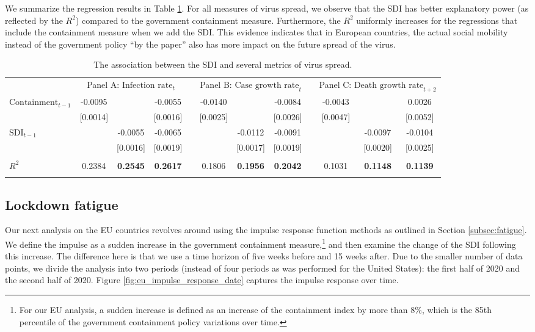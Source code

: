 \documentclass[dvipsnames]{article}
\begin{document}
We summarize the regression results in Table \ref{tab:EU}. For all measures of virus spread, we observe that the SDI has better explanatory power (as reflected by the $R^2$) compared to the government containment measure. Furthermore, the $R^2$ uniformly increases for the regressions that include the containment measure when we add the SDI. This evidence indicates that in European countries, the actual social mobility instead of the government policy ``by the paper'' also has more impact on the future spread of the virus.

\begin{table}[h!]
\centering
\begin{tabular}{lccccccccccc}         							
\hline
\noalign{\smallskip}
\hline
\noalign{\smallskip}                                        
& \multicolumn{3}{c}{Panel A: $\text{Infection \ rate}_t$} &   &	 \multicolumn{3}{c}{Panel B: $\text{Case \ growth \ rate}_t$} & 	& \multicolumn{3}{c}{Panel C: $\text{Death \ growth \ rate}_{t+2}$}	\\	
\cmidrule(lr){2-4}\cmidrule(lr){6-8} \cmidrule(lr){9-12} 
$\text{Containment}_{t-1}$	& 	-0.0095	 & 	 &-0.0055	& &-0.0140	 &	 & -0.0084 & 	& 	-0.0043 &	 & 0.0026 \\
	&	[0.0014]	& 	& [0.0016] & 	&[0.0025]	 &	 & [0.0026]& 	&[0.0047] &	 & [0.0052]	\\
$\text{SDI}_{t-1}$	&	&	-0.0055 		& -0.0065	&&	&-0.0112	 & -0.0091 & 	 & &-0.0097 & -0.0104 \\
	&	&[0.0016]	& [0.0019]&  &	&[0.0017] & [0.0019]& 		 & &[0.0020]	 & [0.0025]	\\
\\
$R^2$ & 0.2384  & \textbf{0.2545} & \textbf{0.2617} &		&0.1806 & \textbf{0.1956} & \textbf{0.2042} & &0.1031  & \textbf{0.1148} &  \textbf{0.1139} \\
\hline\noalign{\smallskip} 
\hline\noalign{\smallskip}                                        			
\end{tabular}
\caption{The association between the SDI and several metrics of virus spread.}
\label{tab:EU}
\end{table}

\subsection{Lockdown fatigue}

Our next analysis on the EU countries revolves around using the impulse response function methods as outlined in Section \ref{subsec:fatigue}. We define the impulse as a sudden increase in the government containment measure,\footnote{For our EU analysis, a sudden increase is defined as an increase of the containment index by more than 8\%, which is the 85th percentile of the government containment policy variations over time.} and then examine the change of the SDI following this increase. The difference here is that we use a time horizon of five weeks before and 15 weeks after. Due to the smaller number of data points, we divide the analysis into two periods (instead of four periods as was performed for the United States): the first half of 2020 and the second half of 2020. Figure \ref{fig:eu_impulse_response_date} captures the impulse response over time.
\end{document}
